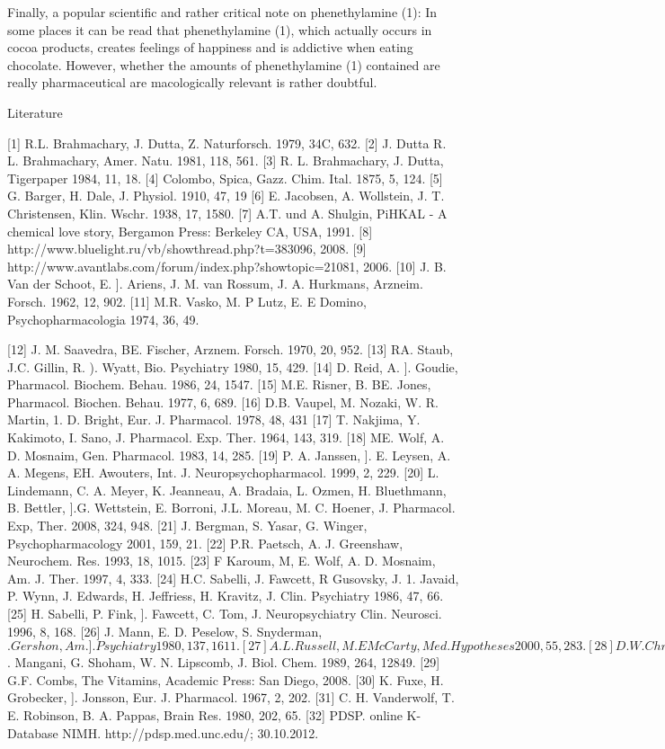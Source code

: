 Finally, a popular scientific and rather critical note on phenethylamine (1): In some places it can be read that phenethylamine (1), which actually occurs in cocoa products, creates feelings of happiness and is addictive when eating chocolate. However, whether the amounts of phenethylamine (1) contained are really pharmaceutical
are macologically relevant is rather doubtful.


Literature


[1] R.L. Brahmachary, J. Dutta, Z. Naturforsch. 1979, 34C, 632.
[2] J. Dutta R. L. Brahmachary, Amer. Natu. 1981, 118, 561.
[3] R. L. Brahmachary, J. Dutta, Tigerpaper 1984, 11, 18.
[4] Colombo, Spica, Gazz. Chim. Ital. 1875, 5, 124.
[5] G. Barger, H. Dale, J. Physiol. 1910, 47, 19
[6] E. Jacobsen, A. Wollstein, J. T. Christensen, Klin. Wschr. 1938, 17, 1580.
[7] A.T. und A. Shulgin, PiHKAL - A chemical love story, Bergamon Press: Berkeley CA,
USA, 1991.
[8] http://www.bluelight.ru/vb/showthread.php?t=383096, 2008.
[9] http://www.avantlabs.com/forum/index.php?showtopic=21081, 2006.
[10] J. B. Van der Schoot, E. ]. Ariens, J. M. van Rossum, J. A. Hurkmans, Arzneim. Forsch.
1962, 12, 902.
[11] M.R. Vasko, M. P Lutz, E. E Domino, Psychopharmacologia 1974, 36, 49.
\clearpage

[12] J. M. Saavedra, BE. Fischer, Arznem. Forsch. 1970, 20, 952.
[13] RA. Staub, J.C. Gillin, R. ). Wyatt, Bio. Psychiatry 1980, 15, 429.
[14] D. Reid, A. ]. Goudie, Pharmacol. Biochem. Behau. 1986, 24, 1547.
[15] M.E. Risner, B. BE. Jones, Pharmacol. Biochen. Behau. 1977, 6, 689.
[16] D.B. Vaupel, M. Nozaki, W. R. Martin, 1. D. Bright, Eur. J. Pharmacol. 1978, 48, 431
[17] T. Nakjima, Y. Kakimoto, I. Sano, J. Pharmacol. Exp. Ther. 1964, 143, 319.
[18] ME. Wolf, A. D. Mosnaim, Gen. Pharmacol. 1983, 14, 285.
[19] P. A. Janssen, ]. E. Leysen, A. A. Megens, EH. Awouters, Int. J. Neuropsychopharmacol.
1999, 2, 229.
[20] L. Lindemann, C. A. Meyer, K. Jeanneau, A. Bradaia, L. Ozmen, H. Bluethmann,
B. Bettler, ].G. Wettstein, E. Borroni, J.L. Moreau, M. C. Hoener, J. Pharmacol. Exp,
Ther. 2008, 324, 948.
[21] J. Bergman, S. Yasar, G. Winger, Psychopharmacology 2001, 159, 21.
[22] P.R. Paetsch, A. J. Greenshaw, Neurochem. Res. 1993, 18, 1015.
[23] F Karoum, M, E. Wolf, A. D. Mosnaim, Am. J. Ther. 1997, 4, 333.
[24] H.C. Sabelli, J. Fawcett, R Gusovsky, J. 1. Javaid, P. Wynn, J. Edwards, H. Jeffriess,
H. Kravitz, J. Clin. Psychiatry 1986, 47, 66.
[25] H. Sabelli, P. Fink, ]. Fawcett, C. Tom, J. Neuropsychiatry Clin. Neurosci. 1996, 8, 168.
[26] J. Mann, E. D. Peselow, S. Snyderman, $. Gershon, Am. ]. Psychiatry 1980, 137, 1611.
[27] A.L. Russell, M. E McCarty, Med. Hypotheses 2000, 55, 283.
[28] D. W. Christianson, $. Mangani, G. Shoham, W. N. Lipscomb, J. Biol. Chem. 1989,
264, 12849.
[29] G.F.  Combs, The Vitamins, Academic Press: San Diego, 2008.
[30] K. Fuxe, H. Grobecker, ]. Jonsson, Eur. J. Pharmacol. 1967, 2, 202.
[31] C. H. Vanderwolf, T. E. Robinson, B. A. Pappas, Brain Res. 1980, 202, 65.
[32] PDSP. online K-Database NIMH. http://pdsp.med.unc.edu/; 30.10.2012.
\clearpage

